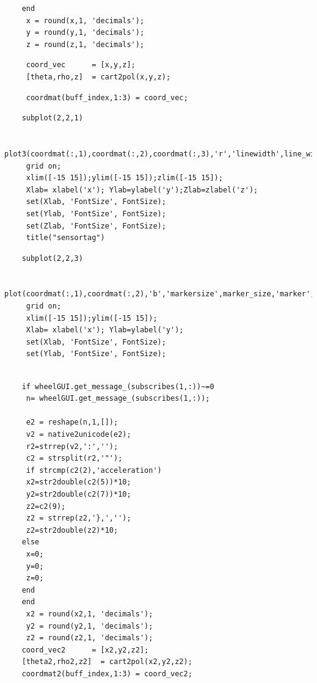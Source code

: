 \documentclass[12pt]{article}
\begin{document}
 	 \begin{lstlisting}
	end
	 x = round(x,1, 'decimals');
 	 y = round(y,1, 'decimals');
	 z = round(z,1, 'decimals');
\end{lstlisting}
\begin{lstlisting}
	 coord_vec      = [x,y,z];  
	 [theta,rho,z]  = cart2pol(x,y,z);
\end{lstlisting}
\begin{lstlisting}
	 coordmat(buff_index,1:3) = coord_vec;
\end{lstlisting}
\begin{lstlisting}	    
	subplot(2,2,1)
	
	 plot3(coordmat(:,1),coordmat(:,2),coordmat(:,3),'r','linewidth',line_wid);
	 grid on;
	 xlim([-15 15]);ylim([-15 15]);zlim([-15 15]);
	 Xlab= xlabel('x'); Ylab=ylabel('y');Zlab=zlabel('z');
	 set(Xlab, 'FontSize', FontSize);
	 set(Ylab, 'FontSize', FontSize);
	 set(Zlab, 'FontSize', FontSize);
	 title("sensortag")
\end{lstlisting}
\begin{lstlisting}	    
	subplot(2,2,3)
	
	 plot(coordmat(:,1),coordmat(:,2),'b','markersize',marker_size,'marker','o','linewidth',line_wid);
	 grid on;    
	 xlim([-15 15]);ylim([-15 15]);
	 Xlab= xlabel('x'); Ylab=ylabel('y');
	 set(Xlab, 'FontSize', FontSize);
	 set(Ylab, 'FontSize', FontSize);
	 
 \end{lstlisting}
 \begin{lstlisting}	
	if wheelGUI.get_message_(subscribes(1,:))~=0
	 n= wheelGUI.get_message_(subscribes(1,:));
	
	 e2 = reshape(n,1,[]);
	 v2 = native2unicode(e2);
	 r2=strrep(v2,':','');
	 c2 = strsplit(r2,'"');
	 if strcmp(c2(2),'acceleration')
 	 x2=str2double(c2(5))*10;
	 y2=str2double(c2(7))*10;
	 z2=c2(9);
	 z2 = strrep(z2,'},','');
	 z2=str2double(z2)*10;
	else
	 x=0;
	 y=0;
	 z=0;
	end
	end
	 x2 = round(x2,1, 'decimals');
	 y2 = round(y2,1, 'decimals');
	 z2 = round(z2,1, 'decimals');    
	coord_vec2      = [x2,y2,z2];  
	[theta2,rho2,z2]  = cart2pol(x2,y2,z2);       
	coordmat2(buff_index,1:3) = coord_vec2;
\end{lstlisting}
\end{document}
